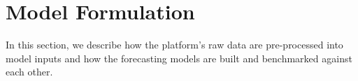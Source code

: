 \section{Model Formulation}
\label{mod}

In this section, we describe how the platform's raw data are pre-processed
    into model inputs and how the forecasting models are built and benchmarked
    against each other.
